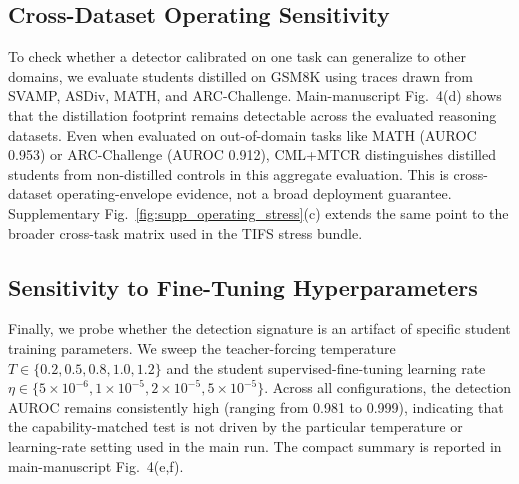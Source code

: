 \subsection{Cross-Dataset Operating Sensitivity}
To check whether a detector calibrated on one task can generalize to other domains, we evaluate students distilled on GSM8K using traces drawn from SVAMP, ASDiv, MATH, and ARC-Challenge.
Main-manuscript Fig.~4(d) shows that the distillation footprint remains detectable
across the evaluated reasoning datasets. Even when evaluated on out-of-domain tasks
like MATH (AUROC 0.953) or ARC-Challenge (AUROC 0.912), CML+MTCR distinguishes
distilled students from non-distilled controls in this aggregate evaluation. This is
cross-dataset operating-envelope evidence, not a broad deployment guarantee.
Supplementary Fig.~\ref{fig:supp_operating_stress}(c) extends the same point to the
broader cross-task matrix used in the TIFS stress bundle.

\subsection{Sensitivity to Fine-Tuning Hyperparameters}
Finally, we probe whether the detection signature is an artifact of specific student training parameters. We sweep the teacher-forcing temperature $T \in \{0.2, 0.5, 0.8, 1.0, 1.2\}$ and the student supervised-fine-tuning learning rate $\eta \in \{5\times 10^{-6}, 1\times 10^{-5}, 2\times 10^{-5}, 5\times 10^{-5}\}$.
Across all configurations, the detection AUROC remains consistently high (ranging
from 0.981 to 0.999), indicating that the capability-matched test is not driven by
the particular temperature or learning-rate setting used in the main run.
The compact summary is reported in main-manuscript Fig.~4(e,f).
